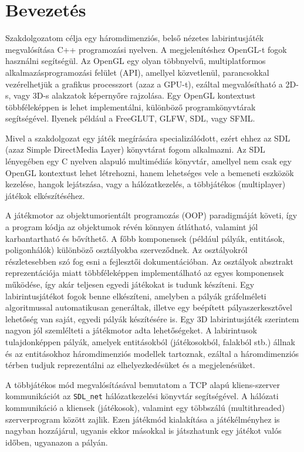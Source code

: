 \chapter{Bevezetés} %
\label{ch:intro}

Szakdolgozatom célja egy háromdimenziós, belső nézetes labirintusjáték megvalósítása C++ programozási nyelven. A megjelenítéshez OpenGL-t fogok használni segítségül. Az OpenGL egy olyan többnyelvű, multiplatformos alkalmazásprogramozási felület (API), amellyel közvetlenül, parancsokkal vezérelhetjük a grafikus processzort (azaz a GPU-t), ezáltal megvalósítható a 2D-s, vagy 3D-s alakzatok képernyőre rajzolása. Egy OpenGL kontextust többféleképpen is lehet implementálni, különböző programkönyvtárak segítségével. Ilyenek például a FreeGLUT, GLFW, SDL, vagy SFML.

Mivel a szakdolgozat egy játék megírására specializálódott, ezért ehhez az SDL (azaz Simple DirectMedia Layer) könyvtárat \cite{libsdl} fogom alkalmazni. Az SDL lényegében egy C nyelven alapuló multimédiás könyvtár, amellyel nem csak egy OpenGL kontextust lehet létrehozni, hanem lehetséges vele a bemeneti eszközök kezelése, hangok lejátszása, vagy a hálózatkezelés, a többjátékos (multiplayer) játékok elkészítéséhez.

A játékmotor az objektumorientált programozás (OOP) paradigmáját követi, így a program kódja az objektumok révén könnyen átlátható, valamint jól karbantartható és bővíthető. A főbb komponensek (például pályák, entitások, poligonhálók) különböző osztályokba szerveződnek. Az osztályokról részletesebben szó fog esni a fejlesztői dokumentációban. Az osztályok absztrakt reprezentációja miatt többféleképpen implementálható az egyes komponensek működése, így akár teljesen egyedi játékokat is tudunk készíteni. Egy labirintusjátékot fogok benne elkészíteni, amelyben a pályák gráfelméleti algoritmussal automatikusan generáltak, illetve egy beépített pályaszerkesztővel lehetőség van saját, egyedi pályák készítésére is. Egy 3D labirintusjáték szerintem nagyon jól szemlélteti a játékmotor adta lehetőségeket. A labirintusok tulajdonképpen pályák, amelyek entitásokból (játékosokból, falakból stb.) állnak és az entitásokhoz háromdimenziós modellek tartoznak, ezáltal a háromdimenziós térben tudjuk reprezentálni az elhelyezkedésüket és a megjelenésüket. 

A többjátékos mód megvalósításával bemutatom a TCP alapú kliens-szerver kommunikációt az \verb|SDL_net| hálózatkezelési könyvtár segítségével. A hálózati kommunikáció a kliensek (játékosok), valamint egy többszálú (multithreaded) szerverprogram között zajlik. Ezen játékmód kialakítása a játékélményhez is nagyban hozzájárul, ugyanis ekkor másokkal is játszhatunk egy játékot valós időben, ugyanazon a pályán.